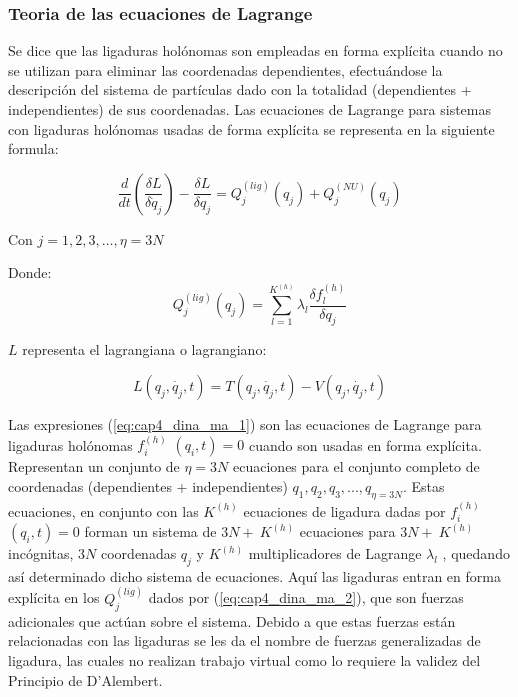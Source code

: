         \subsubsection{Teoria de las ecuaciones de Lagrange}

        Se dice que las ligaduras holónomas son empleadas en forma explícita cuando no se utilizan para eliminar las coordenadas dependientes, efectuándose la descripción del sistema de partículas dado con la totalidad (dependientes + independientes) de sus coordenadas. Las ecuaciones de Lagrange para sistemas con ligaduras holónomas usadas de forma explícita se representa en la siguiente formula:
        
        \begin{equation}
             \frac{d}{dt} \left( \frac{ \delta L}{ \delta \dot{q}_{j}} \right) -\frac{ \delta L}{ \delta q_{j}}=Q_{j}^{ \left( lig \right) } \left( q_{j} \right) +Q_{j}^{ \left( NU \right) } \left( q_{j} \right)
             \label{eq:cap4_dina_ma_1}
        \end{equation}
        
        Con  $ j=1,2,3, \ldots , \eta =3N $ 

        Donde:
        \begin{equation}
          Q_{j}^{ \left( lig \right) } \left( q_{j} \right) = \sum _{l=1}^{K^{ \left( h \right) }} \lambda _{l}\frac{ \delta f_{l}^{ \left( h \right) }}{ \delta q_{j}}
             \label{eq:cap4_dina_ma_2}
        \end{equation}

         \( L \)  representa el lagrangiana o lagrangiano:\par
        
        
        \begin{equation}
         L \left( q_{j},\dot{q_{j}},t \right) =T \left( q_{j},\dot{q_{j}},t \right) -V \left( q_{j},\dot{q_{j}},t \right) 
             \label{eq:cap4_dina_ma_3}
        \end{equation}


      Las expresiones (\ref{eq:cap4_dina_ma_1}) son las ecuaciones de Lagrange para ligaduras holónomas  $f_{i}^{(h)}$ $( q_{i},t) =0$  cuando son usadas en forma explícita. Representan un conjunto de  $\eta =3N$  ecuaciones para el conjunto completo de coordenadas (dependientes + independientes)  $q_{1},q_{2},q_{3},...,q_{\eta=3N}$. Estas ecuaciones, en conjunto con las  $K^{ \left( h \right) }$ ecuaciones de ligadura dadas por $f_{i}^{(h)}$ $( q_{i},t) =0$  forman un sistema de   $ 3N+~K^{ \left( h \right) } $  ecuaciones para  $ 3N+~K^{ \left( h \right) } $  incógnitas,  $ 3N $  coordenadas  $ q_{j} $ y  $ K^{ \left( h \right) } $ multiplicadores de Lagrange  $ \lambda _{l}$ , quedando así determinado dicho sistema de ecuaciones. Aquí las ligaduras entran en forma explícita en los  $ Q_{j}^{ \left( lig \right) }$ dados por (\ref{eq:cap4_dina_ma_2}), que son fuerzas adicionales que actúan sobre el sistema. Debido a que estas fuerzas están relacionadas con las ligaduras se les da el nombre de fuerzas generalizadas de ligadura, las cuales no realizan trabajo virtual como lo requiere la validez del Principio de D’Alembert.


